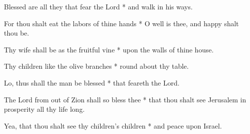 \begin{multicols}{2}
	
	Blessed are all they that fear the Lord * and walk in his ways.
	
	For thou shalt eat the labors of thine hands * O well is thee, and happy shalt thou be.
	
	Thy wife shall be as the fruitful vine * upon the walls of thine house.
	
	Thy children like the olive branches * round about thy table.
	
	Lo, thus shall the man be blessed * that feareth the Lord.
	
	The Lord from out of Zion shall so bless thee * that thou shalt see Jerusalem in prosperity all thy life long.
	
	Yea, that thou shalt see thy children's children * and peace upon Israel.
	
	\gloria{}
\end{multicols}